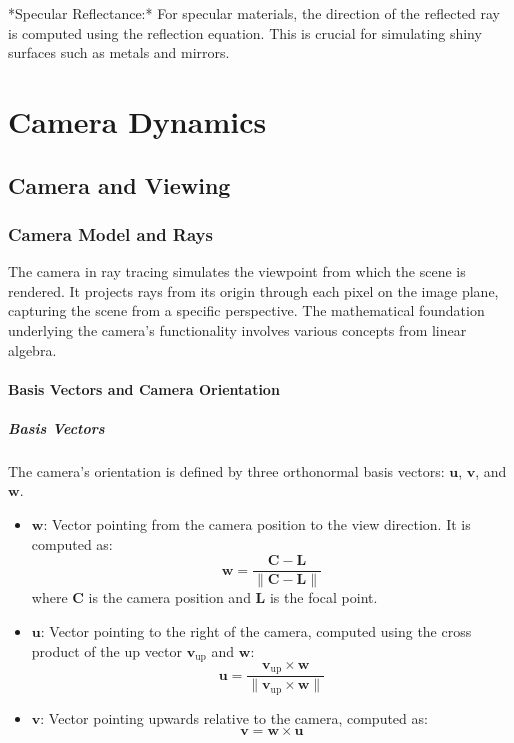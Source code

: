 \documentclass[12pt]{article}
\begin{document}
*Specular Reflectance:* For specular materials, the direction of the reflected ray is computed using the reflection equation. This is crucial for simulating shiny surfaces such as metals and mirrors.

\section{Camera Dynamics}
\label{sec:camera}

\subsection{Camera and Viewing}
\label{subsec:camera-viewing}

\subsubsection{Camera Model and Rays}
The camera in ray tracing simulates the viewpoint from which the scene is rendered. It projects rays from its origin through each pixel on the image plane, capturing the scene from a specific perspective. The mathematical foundation underlying the camera's functionality involves various concepts from linear algebra.

\paragraph{Basis Vectors and Camera Orientation}

\subparagraph{Basis Vectors}
The camera's orientation is defined by three orthonormal basis vectors: \(\mathbf{u}\), \(\mathbf{v}\), and \(\mathbf{w}\).
\begin{itemize}
    \item \(\mathbf{w}\): Vector pointing from the camera position to the view direction. It is computed as:
          \[
              \mathbf{w} = \frac{\mathbf{C} - \mathbf{L}}{\|\mathbf{C} - \mathbf{L}\|}
          \]
          where \(\mathbf{C}\) is the camera position and \(\mathbf{L}\) is the focal point.
    \item \(\mathbf{u}\): Vector pointing to the right of the camera, computed using the cross product of the up vector \(\mathbf{v}_{\text{up}}\) and \(\mathbf{w}\):
          \[
              \mathbf{u} = \frac{\mathbf{v}_{\text{up}} \times \mathbf{w}}{\|\mathbf{v}_{\text{up}} \times \mathbf{w}\|}
          \]
    \item \(\mathbf{v}\): Vector pointing upwards relative to the camera, computed as:
          \[
              \mathbf{v} = \mathbf{w} \times \mathbf{u}
          \]
\end{itemize}
\end{document}
